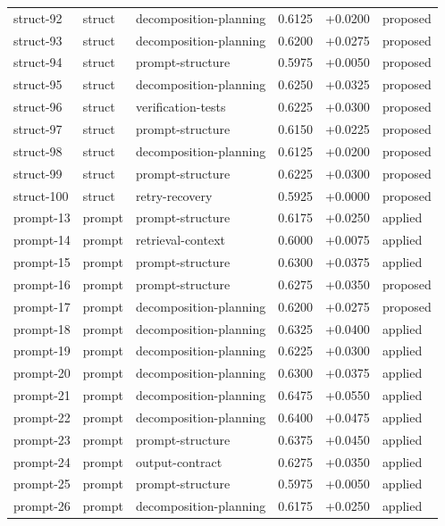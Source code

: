 \begin{center}
\begin{longtable}{llp{5.2cm}rrl}
struct-92 & struct & decomposition-planning & 0.6125 & +0.0200 & proposed \\
struct-93 & struct & decomposition-planning & 0.6200 & +0.0275 & proposed \\
struct-94 & struct & prompt-structure & 0.5975 & +0.0050 & proposed \\
struct-95 & struct & decomposition-planning & 0.6250 & +0.0325 & proposed \\
struct-96 & struct & verification-tests & 0.6225 & +0.0300 & proposed \\
struct-97 & struct & prompt-structure & 0.6150 & +0.0225 & proposed \\
struct-98 & struct & decomposition-planning & 0.6125 & +0.0200 & proposed \\
struct-99 & struct & prompt-structure & 0.6225 & +0.0300 & proposed \\
struct-100 & struct & retry-recovery & 0.5925 & +0.0000 & proposed \\
prompt-13 & prompt & prompt-structure & 0.6175 & +0.0250 & applied \\
prompt-14 & prompt & retrieval-context & 0.6000 & +0.0075 & applied \\
prompt-15 & prompt & prompt-structure & 0.6300 & +0.0375 & applied \\
prompt-16 & prompt & prompt-structure & 0.6275 & +0.0350 & proposed \\
prompt-17 & prompt & decomposition-planning & 0.6200 & +0.0275 & proposed \\
prompt-18 & prompt & decomposition-planning & 0.6325 & +0.0400 & applied \\
prompt-19 & prompt & decomposition-planning & 0.6225 & +0.0300 & applied \\
prompt-20 & prompt & decomposition-planning & 0.6300 & +0.0375 & applied \\
prompt-21 & prompt & decomposition-planning & 0.6475 & +0.0550 & applied \\
prompt-22 & prompt & decomposition-planning & 0.6400 & +0.0475 & applied \\
prompt-23 & prompt & prompt-structure & 0.6375 & +0.0450 & applied \\
prompt-24 & prompt & output-contract & 0.6275 & +0.0350 & applied \\
prompt-25 & prompt & prompt-structure & 0.5975 & +0.0050 & applied \\
prompt-26 & prompt & decomposition-planning & 0.6175 & +0.0250 & applied \\

\end{longtable}
\end{center}
